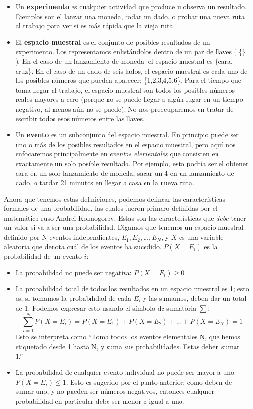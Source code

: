 \documentclass[
  12pt,
]{book}
\providecommand{\tightlist}{%
  \setlength{\itemsep}{0pt}\setlength{\parskip}{0pt}}
\theoremstyle{definition}
\theoremstyle{definition}
\theoremstyle{definition}
\theoremstyle{remark}
\begin{document}
\begin{itemize}
\tightlist
\item
  Un \textbf{experimento} es cualquier actividad que produce u observa un resultado. Ejemplos son el lanzar una moneda, rodar un dado, o probar una nueva ruta al trabajo para ver si es más rápida que la vieja ruta.
\item
  El \textbf{espacio muestral} es el conjunto de posibles resultados de un experimento. Los representamos enlistándolos dentro de un par de llaves ( \{\} ). En el caso de un lanzamiento de moneda, el espacio muestral es \{cara, cruz\}. En el caso de un dado de seis lados, el espacio muestral es cada uno de los posibles números que pueden aparecer: \{1,2,3,4,5,6\}. Para el tiempo que toma llegar al trabajo, el espacio muestral son todos los posibles números reales mayores a cero (porque no se puede llegar a algún lugar en un tiempo negativo, al menos aún no se puede). No nos preocuparemos en tratar de escribir todos esos números entre las llaves.
\item
  Un \textbf{evento} es un subconjunto del espacio muestral. En principio puede ser uno o más de los posibles resultados en el espacio muestral, pero aquí nos enfocaremos principalmente en \emph{eventos elementales} que consisten en exactamente un solo posible resultado. Por ejemplo, esto podría ser el obtener cara en un solo lanzamiento de moneda, sacar un 4 en un lanzamiento de dado, o tardar 21 minutos en llegar a casa en la nueva ruta.
\end{itemize}

Ahora que tenemos estas definiciones, podemos delinear las características formales de una probabilidad, las cuales fueron primero definidas por el matemático ruso Andrei Kolmogorov. Estas son las características que \emph{debe} tener un valor si va a ser una probabilidad. Digamos que tenemos un espacio muestral definido por N eventos independientes, \({E_1, E_2, ... , E_N}\), y \(X\) es una variable aleatoria que denota cuál de los eventos ha sucedido. \(P(X=E_i)\) es la probabilidad de un evento \(i\):

\begin{itemize}
\tightlist
\item
  La probabilidad no puede ser negativa: \(P(X=E_i) \ge 0\)
\item
  La probabilidad total de todos los resultados en un espacio muestral es 1; esto es, si tomamos la probabilidad de cada \(E_i\) y las sumamos, deben dar un total de 1. Podemos expresar esto usando el símbolo de sumatoria \(\sum\):
  \[
  \sum_{i=1}^N{P(X=E_i)} = P(X=E_1) + P(X=E_2) + ... + P(X=E_N) = 1
  \]
  Esto se interpreta como ``Toma todos los eventos elementales N, que hemos etiquetado desde 1 hasta N, y suma sus probabilidades. Estas deben sumar 1.''
\item
  La probabilidad de cualquier evento individual no puede ser mayor a uno: \(P(X=E_i)\le 1\). Esto es sugerido por el punto anterior; como deben de sumar uno, y no pueden ser números negativos, entonces cualquier probabilidad en particular debe ser menor o igual a uno.
\end{itemize}
\end{document}
